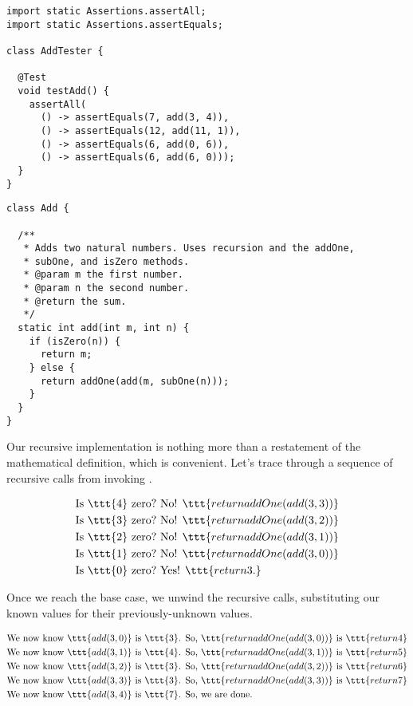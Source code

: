 \enlargethispage{-5\baselineskip}
\begin{lstlisting}[language=MyJava]
import static Assertions.assertAll;
import static Assertions.assertEquals;

class AddTester {
  
  @Test
  void testAdd() {
    assertAll(
      () -> assertEquals(7, add(3, 4)),
      () -> assertEquals(12, add(11, 1)),
      () -> assertEquals(6, add(0, 6)),
      () -> assertEquals(6, add(6, 0)));
  }
}
\end{lstlisting}

\begin{lstlisting}[language=MyJava]
class Add {

  /**
   * Adds two natural numbers. Uses recursion and the addOne, 
   * subOne, and isZero methods.
   * @param m the first number.
   * @param n the second number.
   * @return the sum.
   */
  static int add(int m, int n) {
    if (isZero(n)) { 
      return m;
    } else {
      return addOne(add(m, subOne(n)));
    }
  }
}
\end{lstlisting}

Our recursive implementation is nothing more than a restatement of the mathematical definition, which is convenient. 
Let's trace through a sequence of recursive calls from invoking .

\begin{align*}
    \text{Is }\ttt{4} \text{ zero?} &\text{ No! }\ttt{return addOne(add(3, 3))}\\
    \text{Is }\ttt{3} \text{ zero?} &\text{ No! }\ttt{return addOne(add(3, 2))}\\
    \text{Is }\ttt{2} \text{ zero?} &\text{ No! }\ttt{return addOne(add(3, 1))}\\
    \text{Is }\ttt{1} \text{ zero?} &\text{ No! }\ttt{return addOne(add(3, 0))}\\
    \text{Is }\ttt{0} \text{ zero?} &\text{ Yes! }\ttt{return 3.}
\end{align*}

Once we reach the base case, we unwind the recursive calls, substituting our known values for their previously-unknown values.

\begin{align*}
    \text{We now know }\ttt{add(3, 0)} \text{ is }\ttt{3}\text{. So, } &\ttt{return addOne(add(3, 0))} \text{ is } \ttt{return 4}\\
    \text{We now know }\ttt{add(3, 1)} \text{ is }\ttt{4}\text{. So, } &\ttt{return addOne(add(3, 1))} \text{ is } \ttt{return 5}\\
    \text{We now know }\ttt{add(3, 2)} \text{ is }\ttt{3}\text{. So, } &\ttt{return addOne(add(3, 2))} \text{ is } \ttt{return 6}\\
    \text{We now know }\ttt{add(3, 3)} \text{ is }\ttt{3}\text{. So, } &\ttt{return addOne(add(3, 3))} \text{ is } \ttt{return 7}\\
    \text{We now know }\ttt{add(3, 4)} \text{ is }\ttt{7}\text{. So, } &\text{we are done.} 
\end{align*}

